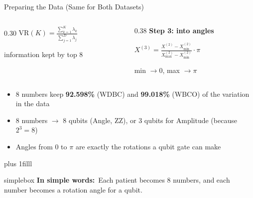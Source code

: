 \documentclass[aspectratio=169,11pt,t,xcolor={table}]{beamer}
\newcommand{\insimple}[1]{%
  \par\vskip 0pt plus 1filll
  \begin{beamercolorbox}[wd=\textwidth,sep=4pt,rounded=true]{simplebox}%
    \small\textbf{\textcolor{qamber!75!black}{In simple words:}}\ #1%
  \end{beamercolorbox}\vskip1pt}
\begin{document}
\begin{frame}{Preparing the Data (Same for Both Datasets)}
\begin{columns}[T,onlytextwidth]
\begin{column}{0.30\textwidth}
      $\displaystyle \mathrm{VR}(K)=\frac{\sum_{k=1}^{K}\lambda_k}{\sum_{j=1}^{D}\lambda_j}$\par{\scriptsize information kept by top 8}
    \end{column}
    \begin{column}{0.38\textwidth}\centering
      {\footnotesize\bfseries Step 3: into angles}\par\vspace{1mm}
      $\displaystyle X^{(3)}=\frac{X^{(2)}-X^{(2)}_{\min}}{X^{(2)}_{\max}-X^{(2)}_{\min}}\cdot\pi$\par{\scriptsize min $\to 0$, max $\to \pi$}
    \end{column}
  \end{columns}
  \vspace{3mm}
  \footnotesize
  \begin{itemize}
    \item 8 numbers keep \textbf{92.598\%} (WDBC) and \textbf{99.018\%} (WBCO) of the variation in the data
    \item 8 numbers $\rightarrow$ 8 qubits (Angle, ZZ), or 3 qubits for Amplitude (because $2^3=8$)
    \item Angles from 0 to $\pi$ are exactly the rotations a qubit gate can make
  \end{itemize}
  \insimple{Each patient becomes 8 numbers, and each number becomes a rotation angle for a qubit.}
\end{frame}
\end{document}
